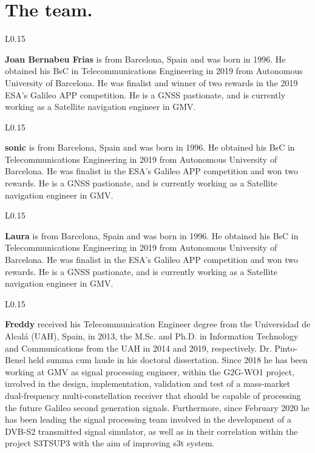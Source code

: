 
\section{The team.}
\begin{wrapfigure}{L}{0.15\textwidth}
    \end{wrapfigure}
\textbf{Joan Bernabeu Frias} is from Barcelona, Spain and was born in 1996. He obtained his BsC in Telecommunications Engineering in 2019 from Autonomous University of Barcelona. He was finalist and winner of two rewards in the 2019 ESA's Galileo APP competition. He is a GNSS pastionate, and is currently working as a Satellite navigation engineer in GMV.\\

\begin{wrapfigure}{L}{0.15\textwidth}
    \end{wrapfigure}
\textbf{sonic} is from Barcelona, Spain and was born in 1996. He obtained his BsC in Telecommunications Engineering in 2019 from Autonomous University of Barcelona. He was finalist in the ESA's Galileo APP competition and won two rewards. He is a GNSS pastionate, and is currently working as a Satellite navigation engineer in GMV.\\

\begin{wrapfigure}{L}{0.15\textwidth}
    \end{wrapfigure}
\textbf{Laura} is from Barcelona, Spain and was born in 1996. He obtained his BsC in Telecommunications Engineering in 2019 from Autonomous University of Barcelona. He was finalist in the ESA's Galileo APP competition and won two rewards. He is a GNSS pastionate, and is currently working as a Satellite navigation engineer in GMV.\\

\begin{wrapfigure}{L}{0.15\textwidth}
    \end{wrapfigure}
\textbf{Freddy} received his Telecommunication Engineer degree from the Universidad de Alcalá (UAH), Spain, in 2013, the M.Sc. and Ph.D. in Information Technology and Communications from the UAH in 2014 and 2019, respectively. Dr. Pinto-Benel held summa cum laude in his doctoral dissertation. Since 2018 he has been working at GMV as signal processing engineer, within the G2G-WO1 project, involved in the design, implementation, validation and test of a mass-market dual-frequency multi-constellation receiver that should be capable of processing the future Galileo second generation signals. Furthermore, since February 2020 he has been leading the signal processing team involved in the development of a DVB-S2 transmitted signal simulator, as well as in their correlation within the project S3TSUP3 with the aim of improving s3t system.\\

